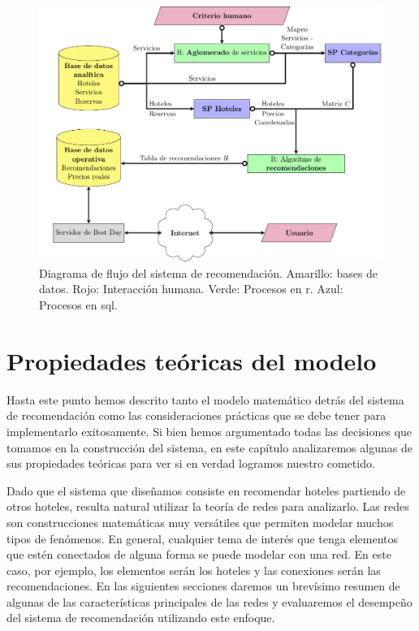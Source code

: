 \documentclass[12pt]{report}
\begin{document}
\begin{figure}[ht]
	\centering
	\includegraphics[width=\textwidth]{imagenes/flowchart.pdf}
	\caption{\label{fig:flujo} Diagrama de flujo del sistema de recomendación. Amarillo: bases de datos. Rojo: Interacción humana. Verde: Procesos en \gls{r}. Azul: Procesos en \gls{sql}.}
\end{figure}


\chapter{Propiedades teóricas del modelo} \label{cap:4}

Hasta este punto hemos descrito tanto el modelo matemático detrás del sistema de recomendación como las consideraciones prácticas que se debe tener para implementarlo exitosamente. Si bien hemos argumentado todas las decisiones que tomamos en la construcción del sistema, en este capítulo analizaremos algunas de sus propiedades teóricas para ver si en verdad logramos nuestro cometido.

Dado que el sistema que diseñamos consiste en recomendar hoteles partiendo de otros hoteles, resulta natural utilizar la teoría de redes para analizarlo. Las redes son construcciones matemáticas muy versátiles que permiten modelar muchos tipos de fenómenos. En general, cualquier tema de interés que tenga elementos que estén conectados de alguna forma se puede modelar con una red. En este caso, por ejemplo, los elementos serán los hoteles y las conexiones serán las recomendaciones. En las siguientes secciones daremos un brevísimo resumen de algunas de las características principales de las redes y evaluaremos el desempeño del sistema de recomendación utilizando este enfoque.
\end{document}
